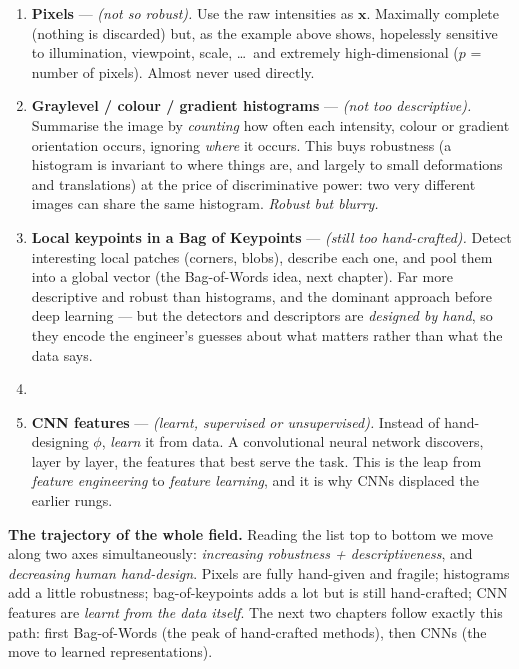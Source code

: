 \documentclass{report}
\newcommand{\xvec}{\mathbf{x}}
\begin{document}
\begin{enumerate}
\item \textbf{Pixels} --- \emph{(not so robust).} Use the raw intensities as
$\xvec$. Maximally complete (nothing is discarded) but, as the example above
shows, hopelessly sensitive to illumination, viewpoint, scale, \dots\ and
extremely high-dimensional ($p$ = number of pixels). Almost never used
directly.

\item \textbf{Graylevel / colour / gradient histograms} --- \emph{(not too
descriptive).} Summarise the image by \emph{counting} how often each intensity,
colour or gradient orientation occurs, ignoring \emph{where} it occurs. This
buys robustness (a histogram is invariant to where things are, and largely to
small deformations and translations) at the price of discriminative power: two
very different images can share the same histogram. \emph{Robust but blurry.}

\item \textbf{Local keypoints in a Bag of Keypoints} --- \emph{(still too
hand-crafted).} Detect interesting local patches (corners, blobs), describe
each one, and pool them into a global vector (the Bag-of-Words idea, next
chapter). Far more descriptive and robust than histograms, and the dominant
approach before deep learning --- but the detectors and descriptors are
\emph{designed by hand}, so they encode the engineer's guesses about what
matters rather than what the data says.

\item[$\;\vdots$]

\item \textbf{CNN features} --- \emph{(learnt, supervised or unsupervised).}
Instead of hand-designing $\phi$, \emph{learn} it from data. A convolutional
neural network discovers, layer by layer, the features that best serve the
task. This is the leap from \emph{feature engineering} to \emph{feature
learning}, and it is why CNNs displaced the earlier rungs.
\end{enumerate}

\begin{keybox}
\textbf{The trajectory of the whole field.} Reading the list top to bottom we
move along two axes simultaneously: \emph{increasing robustness +
descriptiveness}, and \emph{decreasing human hand-design}. Pixels are fully
hand-given and fragile; histograms add a little robustness; bag-of-keypoints
adds a lot but is still hand-crafted; CNN features are \emph{learnt from the
data itself}. The next two chapters follow exactly this path: first
Bag-of-Words (the peak of hand-crafted methods), then CNNs (the move to
learned representations).
\end{keybox}
\end{document}
